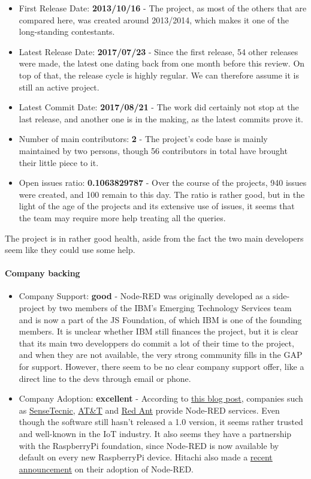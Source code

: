 \documentclass{article}
\begin{document}
\begin{itemize}
\item First Release Date: \textbf{2013/10/16} - The project, as most of the others that are compared here, was created around 2013/2014, which makes it one of the long-standing contestants.
\item Latest Release Date: \textbf{2017/07/23} - Since the first release, 54 other releases were made, the latest one dating back from one month before this review. On top of that, the release cycle is highly regular. We can therefore assume it is still an active project.
\item Latest Commit Date: \textbf{2017/08/21} - The work did certainly not stop at the last release, and another one is in the making, as the latest commits prove it.
\item Number of main contributors: \textbf{2} - The project's code base is mainly maintained by two persons, though 56 contributors in total have brought their little piece to it.
\item Open issues ratio: \textbf{0.1063829787} - Over the course of the projects, 940 issues were created, and 100 remain to this day. The ratio is rather good, but in the light of the age of the projects and its extensive use of issues, it seems that the team may require more help treating all the queries.
\end{itemize}

The project is in rather good health, aside from the fact the two main developers seem like they could use some help.

\paragraph{Company backing}

\begin{itemize}
\item Company Support: \textbf{good} - Node-RED was originally developed as a side-project by two members of the IBM’s Emerging Technology Services team and is now a part of the JS Foundation, of which IBM is one of the founding members. It is unclear whether IBM still finances the project, but it is clear that its main two developpers do commit a lot of their time to the project, and when they are not available, the very strong community fills in the GAP for support. However, there seem to be no clear company support offer, like a direct line to the devs through email or phone.
\item Company Adoption: \textbf{excellent} - According to \href{https://nodered.org/blog/2016/10/17/js-foundation}{this blog post}, companies such as \href{https://fred.sensetecnic.com/}{SenseTecnic}, \href{https://flow.att.com/}{AT\&T} and \href{https://www.redconnect.io/}{Red Ant} provide Node-RED services. Even though the software still hasn't released a 1.0 version, it seems rather trusted and well-known in the IoT industry. It also seems they have a partnership with the RaspberryPi foundation, since Node-RED is now available by default on every new RaspberryPi device. Hitachi also made a \href{http://www.prweb.com/releases/2017/08/prweb14579081.htm}{recent announcement} on their adoption of Node-RED.
\end{itemize}
\end{document}
